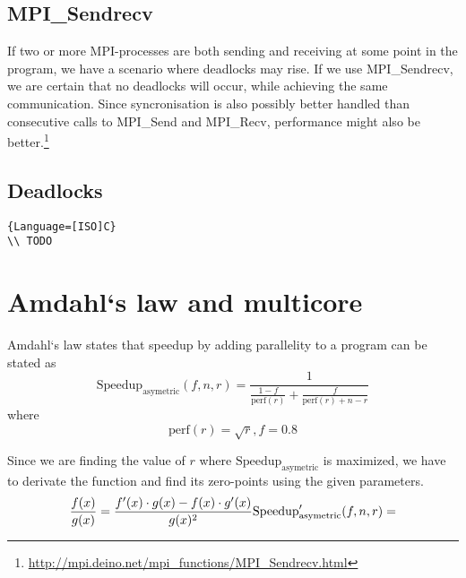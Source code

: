 \documentclass[english,a4paper,numbers=noenddot]{scrartcl}
\begin{document}
\subsection{MPI\_Sendrecv}
If two or more MPI-processes are both sending and receiving at some point in the program, we have a scenario where deadlocks may rise. If we use MPI\_Sendrecv, we are certain that no deadlocks will occur, while achieving the same communication. Since syncronisation is also possibly better handled than consecutive calls to MPI\_Send and MPI\_Recv, performance might also be better.\footnote{\url{http://mpi.deino.net/mpi_functions/MPI_Sendrecv.html}}

\subsection{Deadlocks}
\begin{lstlisting}{Language=[ISO]C}
\\ TODO
\end{lstlisting}

\section{Amdahl`s law and multicore}
Amdahl`s law states that speedup by adding parallelity to a program can be stated as
\begin{equation}
    \text{Speedup}_{\text{asymetric}} (f,n,r)= \frac{1}{\frac{1-f}{\text{perf}(r)} + \frac{f}{\text{perf}(r) + n - r}}
\end{equation}
where
\begin{equation}
    \text{perf}(r)=\sqrt r,f=0.8
\end{equation}

Since we are finding the value of $r$ where $\text{Speedup}_\text{asymetric}$ is maximized, we have to derivate the function and find its zero-points using the given parameters.
\begin{equation}
    \frac{f(x)}{g(x)} = \frac{f'(x)\cdot g(x) - f(x)\cdot g'(x)}{g(x)^2}\newline
    \text{Speedup}_\text{asymetric}'(f,n,r)= 
\end{equation}
\end{document}
